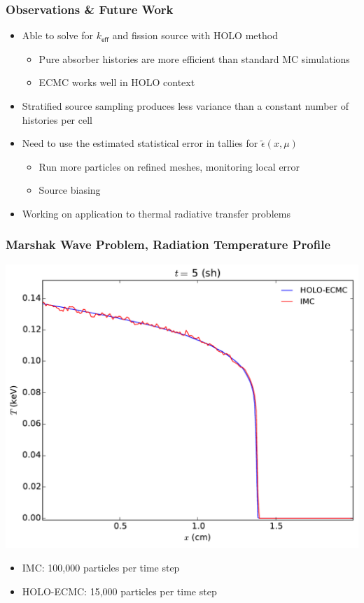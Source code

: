 \documentclass[xcolor=dvipsnames]{beamer}
\newcommand{\keff}[0]{\ensuremath{{k}_{\textsf{eff}}} }
\newcommand{\colb}[1]{{\color{blue} #1}}
\newcommand{\colr}[1]{{\color{red} #1}}
\newlength{\wideitemsep}
\let\olditem\item
\renewcommand{\item}{\setlength{\itemsep}{\wideitemsep}\olditem}
\begin{document}
\begin{frame}
    \frametitle{Observations \& Future Work}
    \begin{itemize}
        \item Able to solve for $\keff$ and fission source with HOLO method
        \begin{itemize}
            \item Pure absorber histories are more efficient than standard MC simulations
            \item ECMC works well in HOLO context
        \end{itemize}
        \pause
        \item Stratified source sampling produces less variance than a constant
            number of histories per cell \pause
        \item Need to use the estimated statistical error in tallies for $\tilde\epsilon(x,\mu)$ 
        \begin{itemize}
            \item Run more particles on refined meshes, monitoring local error
            \item Source biasing \pause
         \end{itemize}
     \item Working on application to \colb{thermal radiative transfer} problems
    \end{itemize}

\end{frame}

\begin{frame}
    \frametitle{Marshak Wave Problem, Radiation Temperature Profile}
  \centering
  \includegraphics[width=0.69\linewidth]{marshak_200_compare.pdf}
  \begin{itemize}
      \item \colr{IMC}: 100,000 particles per time step
      \item \colb{HOLO-ECMC}: 15,000 particles per time step
  \end{itemize}

\end{frame}
\end{document}
